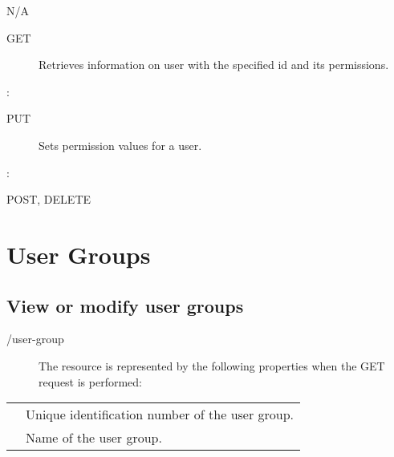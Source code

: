 \documentclass[letterpaper,10pt,english]{sphinxmanual}
\begin{document}
 N/A
\begin{description}
\item[{ GET}] \leavevmode
Retrieves information on user with the specified id and its permissions.

\end{description}

:

\begin{sphinxVerbatim}[commandchars=\\\{\}]
\end{sphinxVerbatim}
\begin{description}
\item[{ PUT}] \leavevmode
Sets permission values for a user.

\end{description}

:

\begin{sphinxVerbatim}[commandchars=\\\{\}]
\end{sphinxVerbatim}

 POST, DELETE


\section{User Groups}
\label{\detokenize{restapi:user-groups}}

\subsection{View or modify user groups}
\label{\detokenize{restapi:view-or-modify-user-groups}}
 /user-group
\begin{description}
\item[{}] \leavevmode
The resource is represented by the following properties when the GET request is performed:

\end{description}


\begin{savenotes}\sphinxattablestart
\centering
\begin{tabulary}{\linewidth}[t]{|T|T|}
\hline

&
\\
\hline
{}
&
Unique identification number of the user group.
\\
\hline
{}
&
Name of the user group.
\\
\hline
\end{tabulary}
\par
\sphinxattableend\end{savenotes}
\end{document}
